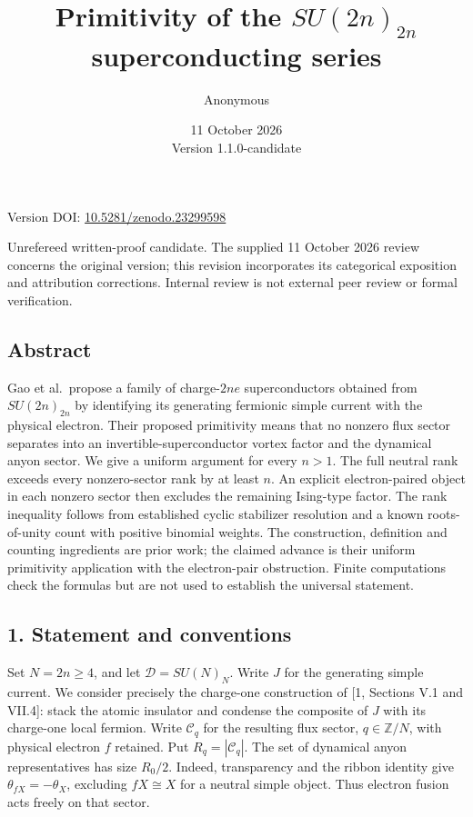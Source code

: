\documentclass[
  11pt,
]{article}
\title{Primitivity of the \(SU(2n)_{2n}\) superconducting series}
\author{Anonymous}
\date{11 October 2026\\Version 1.1.0-candidate}
\begin{document}
\maketitle
\begin{center}
\small Version DOI: \href{https://doi.org/10.5281/zenodo.23299598}{10.5281/zenodo.23299598}
\end{center}
\noindent Unrefereed written-proof candidate. The supplied 11 October
2026 review concerns the original version; this revision incorporates
its categorical exposition and attribution corrections. Internal review
is not external peer review or formal verification.

\subsection{Abstract}\label{abstract}

Gao et al.~propose a family of charge-\hspace{0pt}\(2ne\)
superconductors obtained from \(SU(2n)_{2n}\) by identifying its
generating fermionic simple current with the physical electron. Their
proposed primitivity means that no nonzero flux sector separates into an
invertible-superconductor vortex factor and the dynamical anyon sector.
We give a uniform argument for every \(n>1\). The full neutral rank
exceeds every nonzero-sector rank by at least \(n\). An explicit electron-paired
object in each nonzero sector then excludes the remaining Ising-type
factor. The rank inequality follows from established cyclic stabilizer
resolution and a known roots-of-unity count with positive binomial weights.
The construction, definition and counting ingredients are prior work;
the claimed advance is their uniform primitivity application with the
electron-pair obstruction. Finite computations check the formulas but are not used
to establish the universal statement.

\subsection{1. Statement and
conventions}\label{statement-and-conventions}

Set \(N=2n\ge4\), and let \(\mathcal D=SU(N)_N\). Write \(J\) for the
generating simple current. We consider precisely the charge-one
construction of {[}1, Sections V.1 and VII.4{]}: stack the atomic
insulator and condense the composite of \(J\) with its charge-one local
fermion. Write \(\mathcal C_q\) for the resulting flux sector,
\(q\in\mathbb Z/N\), with physical electron \(f\) retained. Put
\(R_q=|\mathcal C_q|\). The set of dynamical anyon representatives has
size \(R_0/2\). Indeed, transparency and the ribbon identity give
\(\theta_{fX}=-\theta_X\), excluding \(fX\cong X\) for a neutral simple
object. Thus electron fusion acts freely on that sector.
\end{document}
